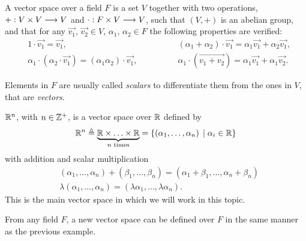 
\begin{defn}
    A vector space over a field $F$ is a set $V$ together with two operations, $+ : V\times V\longrightarrow V$
    and $\cdot : F\times V\longrightarrow V$, such that $\left( V, + \right) $ is an abelian group, and that for any
    $\vec{v_1}$, $\vec{v_2}\in V$, $\alpha_1$, $\alpha_2\in F$ the following properties are verified:
    \begin{align*}
        & 1\cdot \vec{v_1} = \vec{v_1}, \quad\quad\quad\quad & \left( \alpha_1 + \alpha_2 \right) \cdot \vec{v_1} = \alpha_1\vec{v_1} + \alpha_2\vec{v_1}, \\
        & \alpha_1\cdot\left( \alpha_2\cdot \vec{v_1} \right) = \left( \alpha_1\alpha_2 \right) \cdot
        \vec{v_1}, \quad\quad\quad\quad &  \alpha_1\cdot\left( \vec{v_1 + v_2} \right) = \alpha_1\vec{v_1} + \alpha_1\vec{v_2}.
    \end{align*}

\end{defn}

\begin{notation}
Elements in $F$ are usually called \textit{scalars} to differentiate them from the ones in $V$, that are
\textit{vectors}.
\end{notation}

\begin{example}
    $\Rtn$, with $n\in\Z^+$, is a vector space over $\R$ defined by
    \begin{equation}
        \Rtn\bydef \underbrace{\R\times\ldots\times\R}_{n \textrm{ times}} = \{\left( \alpha_1, \ldots,
    \alpha_n \right)\st \alpha_i\in\R\}
    \end{equation}
    with addition and scalar multiplication
    \begin{align}
        &\left( \alpha_1, \ldots, \alpha_n \right) + \left( \beta_1, \ldots, \beta_n \right) = \left( \alpha_1          + \beta_1, \ldots, \alpha_n + \beta_n\right) \\
        &\lambda\left( \alpha_1, \ldots, \alpha_n \right) = \left( \lambda\alpha_1, \ldots, \lambda\alpha_n
        \right).
    \end{align}
    This is the main vector space in which we will work in this topic.
\end{example}

From any field $F$, a new vector space can be defined over $F$ in the same manner as the previous example.

